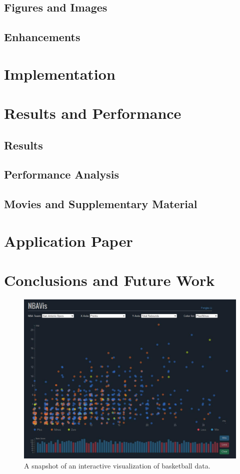 \documentclass[journal]{vgtc}                %
\begin{document}
\subsection{Figures and Images}
\subsection{Enhancements}
\section{Implementation}
\section{Results and Performance}
\subsection{Results}
\subsection{Performance Analysis}
\subsection{Movies and Supplementary Material}
\section{Application Paper}
\section{Conclusions and Future Work}

\newpage



\newpage
\appendix
\begin{figure}[h]
\caption{A snapshot of an interactive visualization of basketball data.}
\includegraphics[width=\linewidth]{georgiatech.jpg}
\end{figure}
\end{document}
